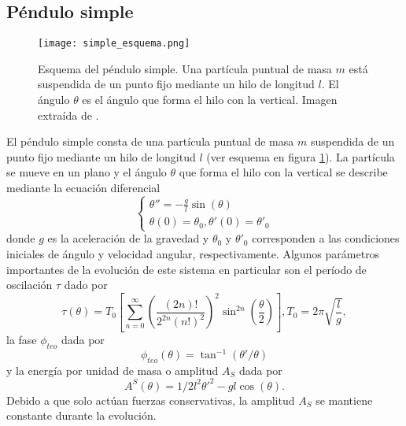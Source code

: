 \documentclass[aps,prb,twocolumn,superscriptaddress,floatfix,longbibliography,10pt]{revtex4-2}
\newif\ifptitle
\newif\ifpnumber
\newcounter{para}
\newcommand\ptitle[1]{\par\refstepcounter{para}
{\ifpnumber{\noindent\textcolor{lightgray}{\textbf{\thepara}}\indent}\fi}
{\ifptitle{\textbf{[{#1}]}}\fi}}
\begin{document}
\subsection{Péndulo simple}

\ptitle{Presentar ecuaciones de la dinámica}

\begin{figure}[h]
  \texttt{[image: simple\_esquema.png]}
  \caption{Esquema del péndulo simple. Una partícula puntual de masa $m$ está suspendida de un punto fijo mediante un hilo de longitud $l$. El ángulo $\theta$ es el ángulo que forma el hilo con la vertical. Imagen extraída de \cite{esquema_pendulo_simple}.}
   \label{fig:simple_esquema}
\end{figure}
% 

El péndulo simple consta de una partícula puntual de masa $m$ suspendida de un punto fijo mediante un hilo de longitud $l$ (ver esquema en figura \ref{fig:simple_esquema}). La partícula se mueve en un plano y el ángulo $\theta$ que forma el hilo con la vertical se describe mediante la ecuación diferencial
\begin{equation}
  \left\{\begin{matrix}
    \theta'' = -\frac{g}{l} \sin{(\theta)} \\
    \theta(0) = \theta_0, \theta'(0) = \theta'_0
   \end{matrix}\right.
  \label{eq:pendulo_simple}
\end{equation}
donde $g$ es la aceleración de la gravedad y $\theta_0$ y $\theta'_0$ corresponden a las condiciones iniciales de ángulo y velocidad angular, respectivamente. Algunos parámetros importantes de la evolución de este sistema en particular son el período de oscilación $\tau$ dado por \cite{periodo_exacto_pendulo_simple}
\begin{equation}
  \tau(\theta) = T_0 \left [ \sum_{n = 0}^\infty \left(  \frac{(2n)!}{2^{2n}(n!)^2} \right )^2 \sin^{2n} \left ( \frac{\theta}{2} \right )   \right ], T_0 = 2 \pi \sqrt{\frac{l}{g}},
  \label{eq:periodo_simple}
\end{equation}
la fase $\phi_{teo}$ dada por
\begin{equation}
  \phi_{teo}(\theta) = \tan^{-1}(\theta'/\theta)
  \label{eq:fase_simple}
\end{equation}
y la energía por unidad de masa o amplitud $A_S$ dada por
\begin{equation}
  A^S(\theta) = 1/2 l^2 \theta'^2 - g l \cos{(\theta)}.
  \label{eq:amplitud_simple}
\end{equation}
Debido a que solo actúan fuerzas conservativas, la amplitud $A_S$ se mantiene constante durante la evolución.
\end{document}
